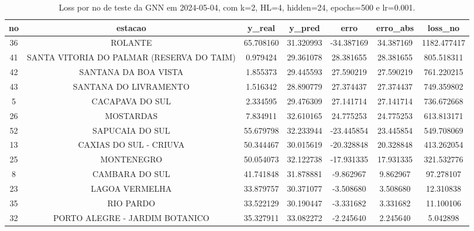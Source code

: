 \begin{table}[h]
\centering
\caption{Loss por no de teste da GNN em 2024-05-04, com k=2, HL=4, hidden=24, epochs=500 e lr=0.001.}
\label{tab:gnn_loss_k2_hl4_h24_e500_d20240504}
\begin{tabular}{ccccccc}
\toprule
no & estacao & y\_real & y\_pred & erro & erro\_abs & loss\_no \\
\midrule
36 & ROLANTE & 65.708160 & 31.320993 & -34.387169 & 34.387169 & 1182.477417 \\
41 & SANTA VITORIA DO PALMAR (RESERVA DO TAIM) & 0.979424 & 29.361078 & 28.381655 & 28.381655 & 805.518311 \\
42 & SANTANA DA BOA VISTA & 1.855373 & 29.445593 & 27.590219 & 27.590219 & 761.220215 \\
43 & SANTANA DO LIVRAMENTO & 1.516342 & 28.890779 & 27.374437 & 27.374437 & 749.359802 \\
5 & CACAPAVA DO SUL & 2.334595 & 29.476309 & 27.141714 & 27.141714 & 736.672668 \\
26 & MOSTARDAS & 7.834911 & 32.610165 & 24.775253 & 24.775253 & 613.813171 \\
52 & SAPUCAIA DO SUL & 55.679798 & 32.233944 & -23.445854 & 23.445854 & 549.708069 \\
13 & CAXIAS DO SUL - CRIUVA & 50.344467 & 30.015619 & -20.328848 & 20.328848 & 413.262054 \\
25 & MONTENEGRO & 50.054073 & 32.122738 & -17.931335 & 17.931335 & 321.532776 \\
8 & CAMBARA DO SUL & 41.741848 & 31.878881 & -9.862967 & 9.862967 & 97.278107 \\
23 & LAGOA VERMELHA & 33.879757 & 30.371077 & -3.508680 & 3.508680 & 12.310838 \\
35 & RIO PARDO & 33.522129 & 30.190447 & -3.331682 & 3.331682 & 11.100106 \\
32 & PORTO ALEGRE - JARDIM BOTANICO & 35.327911 & 33.082272 & -2.245640 & 2.245640 & 5.042898 \\
\bottomrule
\end{tabular}
\end{table}
